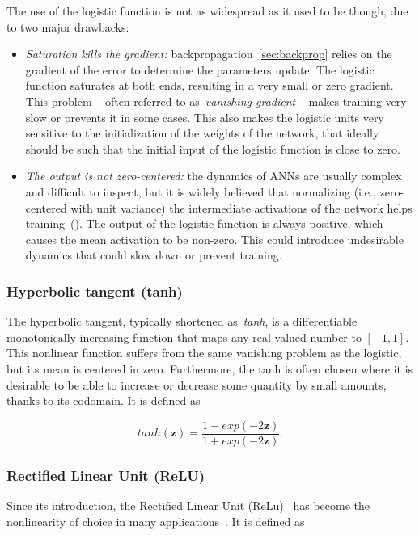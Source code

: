 The use of the logistic function is not as widespread as it used to be though,
due to two major drawbacks:
\begin{itemize}
    \item \emph{Saturation kills the gradient:}
        backpropagation~\autoref{sec:backprop} relies on the gradient of the
        error to determine the parameters update. The logistic function
        saturates at both ends, resulting in a very small or zero gradient.
        This problem -- often referred to as~\emph{vanishing gradient} -- makes
        training very slow or prevents it in some cases. This also makes the
        logistic units very sensitive to the initialization of the weights of
        the network, that ideally should be such that the initial input of the
        logistic function is close to zero.
    \item \emph{The output is not zero-centered:} the dynamics of ANNs are
        usually complex and difficult to inspect, but it is widely believed
        that normalizing (i.e., zero-centered with unit variance) the
        intermediate activations of the network helps
        training~(\cite{Ioffe+Szegedy-2015,Laurent2015,arpit2016normalization,
        cooijmans2016recurrent}). The output of the logistic function is always
        positive, which causes the mean activation to be non-zero. This could
        introduce undesirable dynamics that could slow down or prevent
        training.
\end{itemize}

\subsubsection{Hyperbolic tangent (tanh)}\label{sec:tanh}

The hyperbolic tangent, typically shortened as~\emph{tanh}, is a differentiable
monotonically increasing function that maps any real-valued number to $[-1, 1]$.
This nonlinear function suffers from the same vanishing problem as the
logistic, but its mean is centered in zero. Furthermore, the tanh is often
chosen where it is desirable to be able to increase or decrease some quantity
by small amounts, thanks to its codomain. It is defined as

\begin{equation}\label{eq:tanh}
    tanh(\mathbf{z}) = \frac{1-exp(-2\mathbf{z})}{1+exp(-2\mathbf{z})}.
\end{equation}


\subsubsection{Rectified Linear Unit (ReLU)}\label{sec:relu}
Since its introduction, the Rectified Linear Unit
(ReLu)~\cite{Jarrett-ICCV2009-small,Nair+Hinton-2010} has become the
nonlinearity of choice in many applications~\cite{Krizhevsky-2012,
LeCun-et-al-Nature2015,Glorot+al-AI-2011-small}. It is defined as

